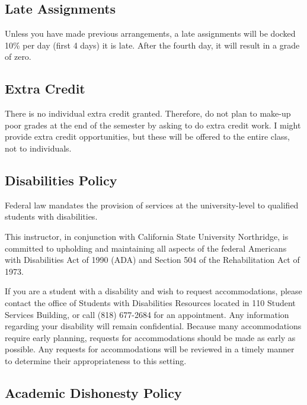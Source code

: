 \documentclass[11pt,]{article}
\begin{document}
\hypertarget{late-assignments}{%
\subsection{Late Assignments}\label{late-assignments}}

Unless you have made previous arrangements, a late assignments will be
docked 10\% per day (first 4 days) it is late. After the fourth day, it
will result in a grade of zero.

\hypertarget{extra-credit}{%
\subsection{Extra Credit}\label{extra-credit}}

There is no individual extra credit granted. Therefore, do not plan to
make-up poor grades at the end of the semester by asking to do extra
credit work. I might provide extra credit opportunities, but these will
be offered to the entire class, not to individuals.

\hypertarget{disabilities-policy}{%
\subsection{Disabilities Policy}\label{disabilities-policy}}

Federal law mandates the provision of services at the university-level
to qualified students with disabilities.

This instructor, in conjunction with California State University
Northridge, is committed to upholding and maintaining all aspects of the
federal Americans with Disabilities Act of 1990 (ADA) and Section 504 of
the Rehabilitation Act of 1973.

If you are a student with a disability and wish to request
accommodations, please contact the office of Students with Disabilities
Resources located in 110 Student Services Building, or call (818)
677-2684 for an appointment. Any information regarding your disability
will remain confidential. Because many accommodations require early
planning, requests for accommodations should be made as early as
possible. Any requests for accommodations will be reviewed in a timely
manner to determine their appropriateness to this setting.

\hypertarget{dishonesty}{%
\subsection{Academic Dishonesty Policy}\label{dishonesty}}
\end{document}
